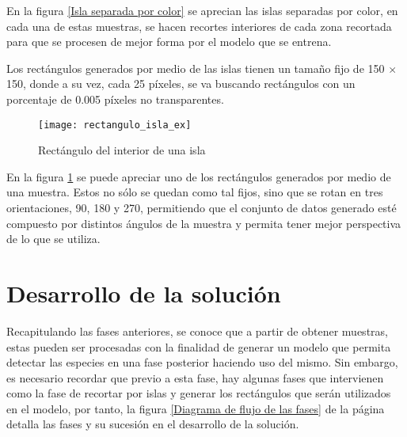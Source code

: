En la figura \ref{Isla separada por color} se aprecian las islas separadas por color, en cada una de estas muestras, se hacen recortes interiores de cada zona recortada para que se procesen de mejor forma por el modelo que se entrena. 

Los rectángulos generados por medio de las islas tienen un tamaño fijo de 150  $\times$ 150, donde a su vez, cada 25 píxeles, se va buscando rectángulos con un porcentaje de 0.005 píxeles no transparentes.


\begin{figure}[h]
  \centering
          \texttt{[image: rectangulo\_isla\_ex]}
    \caption{Rectángulo del interior de una isla}
    \label{Rectángulo del interior de una isla}
\end{figure}


En la figura \ref{Rectángulo del interior de una isla} se puede apreciar uno de los rectángulos generados por medio de una muestra. Estos no sólo se quedan como tal fijos, sino que se rotan en tres orientaciones, 90, 180 y 270, permitiendo que el conjunto de datos generado esté compuesto por distintos ángulos de la muestra y permita tener mejor perspectiva de lo que se utiliza.

\break

%
%
%
%
%

\chapter{Desarrollo de la solución}
Recapitulando las fases anteriores, se conoce que a partir de obtener muestras, estas pueden ser procesadas con la finalidad de generar un modelo que permita detectar las especies en una fase posterior haciendo uso del mismo. Sin embargo, es necesario recordar que previo a esta fase, hay algunas fases que intervienen como la fase de recortar por islas y  generar los rectángulos que serán utilizados en el modelo, por tanto, la figura \ref{Diagrama de flujo de las fases} de la página \pageref{Diagrama de flujo de las fases} detalla las fases y su sucesión en el desarrollo de la solución.

